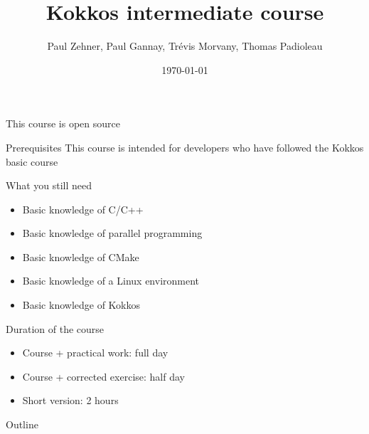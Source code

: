 \documentclass[
    aspectratio=169,
    \createHandout
]{beamer}
\title{Kokkos intermediate course}
\author{\scriptsize Paul Zehner, Paul Gannay, Trévis Morvany, Thomas Padioleau}
\institute{CEA}
\date{\today}
\begin{document}
\begin{frame}[plain]
    \titlepage
\end{frame}


\begin{frame}{This course is open source}
    \begin{center}
    \end{center}
\end{frame}


\begin{frame}{Prerequisites}
    This course is intended for developers who have followed the Kokkos basic course

    \vspace{1em}

    \begin{block}{What you still need}
        \begin{itemize}
            \item Basic knowledge of C/C++
            \item Basic knowledge of parallel programming
            \item Basic knowledge of CMake
            \item Basic knowledge of a Linux environment
            \item Basic knowledge of Kokkos
        \end{itemize}
    \end{block}
\end{frame}


\begin{frame}{Duration of the course}
    \begin{itemize}
        \item Course + practical work: full day
        \item Course + corrected exercise: half day
        \item Short version: 2 hours
    \end{itemize}
\end{frame}

\begin{frame}{Outline}
    \tableofcontents[hidesubsections]
\end{frame}
\end{document}
